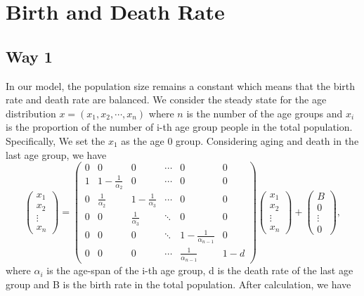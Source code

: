 \documentclass{article}
\begin{document}
\section{Birth and Death Rate}
\subsection{Way 1}
In our model, the population size remains a constant which means that the birth rate and death rate are balanced.  We consider the steady state for the age distribution $x = (x_1, x_2, \cdots, x_n)$ where $n$ is the number of the age groups and $x_i$ is the proportion of the number of i-th age group people in the total population. Specifically, We set the $x_1$ as the age 0 group. Considering aging and death in the last age group, we have
\[
\left(\begin{array}{c}
    x_1  \\
    x_2 \\
    \vdots \\
    x_n
\end{array}\right) = \left(\begin{array}{cccccc}
    0 & 0 & 0 & \cdots  & 0 & 0 \\
    1& 1-\frac{1}{\alpha_2} & 0 &\cdots  & 0 & 0\\
    0 & \frac{1}{\alpha_2} & 1-\frac{1}{\alpha_3} & \cdots  & 0 & 0\\
    0 & 0 & \frac{1}{\alpha_3} & \ddots & 0 & 0\\
    0 & 0 & 0 & \ddots &  1-\frac{1}{\alpha_{n-1}} & 0\\ 
    0 & 0 & 0 &\cdots & \frac{1}{\alpha_{n-1}} & 1-d 
\end{array}\right)\left(\begin{array}{c}
    x_1 \\
    x_2 \\
    \vdots \\
    x_n
\end{array}\right) + \left(\begin{array}{c}
    B  \\
    0\\
    \vdots \\
    0
\end{array}\right),
\]
where $\alpha_i$ is the age-span of the i-th age group, d is the death rate of the last age group and B is the birth rate in the total population. After calculation, we have 
\end{document}
